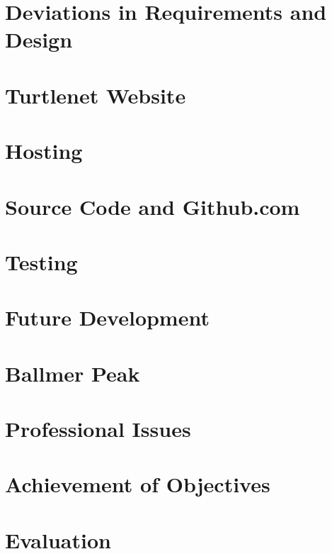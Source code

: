 \chapter{Deviations in Requirements and Design}


\chapter{Turtlenet Website}


\chapter{Hosting}


\chapter{Source Code and Github.com}


\chapter{Testing}


\chapter{Future Development}


\chapter{Ballmer Peak}


\chapter{Professional Issues}


\chapter{Achievement of Objectives}


\chapter{Evaluation}

